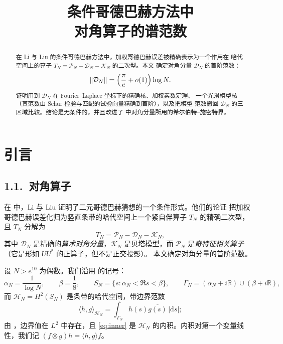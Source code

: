 \documentclass[12pt,a4paper]{amsart}
\numberwithin{equation}{section}
\theoremstyle{plain}
\theoremstyle{definition}
\begin{document}
\title[对角算子的谱范数]{条件哥德巴赫方法中\\ 对角算子的谱范数}

\author{}

\date{}



\begin{abstract}
在 Li 与 Liu 的条件哥德巴赫方法中，加权哥德巴赫误差被精确表示为一个作用在
哈代空间上的算子 $T_N=\mathcal P_N-\mathcal D_N-\mathcal K_N$ 的二次型。本文
确定对角分量 $\mathcal D_N$ 的首阶范数：
\[
 \|\mathcal D_N\|=\Bigl(\frac{\pi}{e}+o(1)\Bigr)\log N .
\]
证明用到 $\mathcal D_N$ 在 Fourier--Laplace 坐标下的精确核、加权素数定理、
一个光滑模型核（其范数由 Schur 检验与匹配的试验向量精确到首阶），以及把模型
范数搬回 $\mathcal D_N$ 的三区域比较。结论是无条件的，并且改进了 \cite{LL}
中对角分量所用的希尔伯特--施密特界。
\end{abstract}

\maketitle

\section{引言}

\subsection*{1.1.\ 对角算子}

在 \cite{LL} 中，Li 与 Liu 证明了二元哥德巴赫猜想的一个条件形式。他们的论证
把加权哥德巴赫误差化归为竖直条带的哈代空间上一个紧自伴算子 $T_N$ 的精确二次型，
且 $T_N$ 分解为
\begin{equation}\label{eq:split}
 T_N=\mathcal P_N-\mathcal D_N-\mathcal K_N,
\end{equation}
其中 $\mathcal D_N$ 是精确的\emph{算术对角分量}，$\mathcal K_N$ 是贝塔模型，而
$\mathcal P_N$ 是\emph{奇特征相关算子}（它是形如 $UU^*$ 的正算子，但不是正交投影）。
本文确定对角分量的首阶范数。

设 $N>e^{10}$ 为偶数。我们沿用 \cite[\S5--6]{LL} 的记号：
\[
 \alpha_N=\frac1{\log N},\qquad \beta=\frac18,\qquad
 S_N=\{s:\alpha_N<\Re s<\beta\},\qquad
 \Gamma_N=(\alpha_N+i\mathbb R)\cup(\beta+i\mathbb R),
\]
而 $\mathcal H_N=H^2(S_N)$ 是条带的哈代空间，带边界范数
\begin{equation}\label{eq:inner}
 \langle h,g\rangle_{\mathcal H_N}
 =\int_{\Gamma_N}h(s)\overline{g(s)}\,|\mathrm ds|;
\end{equation}
由 \cite[引理 5.2]{LL}，边界值在 $L^2$ 中存在，且 \eqref{eq:inner} 是
$\mathcal H_N$ 的内积。内积对第一个变量线性，我们记
$(f\otimes g)h=\langle h,g\rangle f$。
\end{document}
